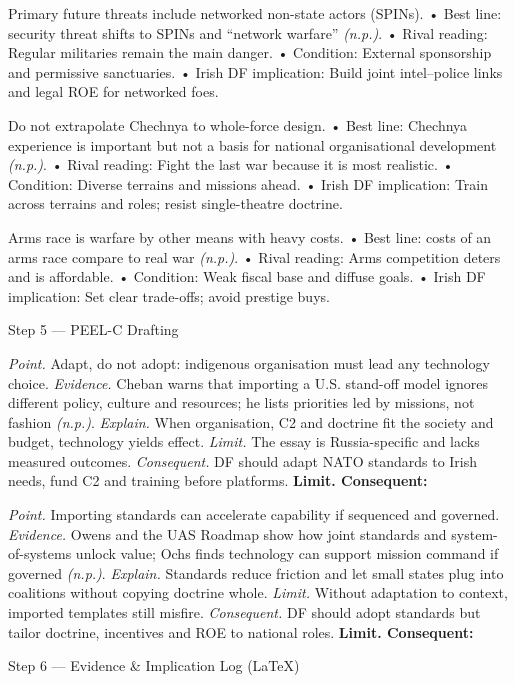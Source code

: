 Primary future threats include networked non-state actors (SPINs).
• Best line: security threat shifts to SPINs and “network warfare” \emph{(n.p.)}.
• Rival reading: Regular militaries remain the main danger.
• Condition: External sponsorship and permissive sanctuaries.
• Irish DF implication: Build joint intel–police links and legal ROE for networked foes.

Do not extrapolate Chechnya to whole-force design.
• Best line: Chechnya experience is important but not a basis for national organisational development \emph{(n.p.)}.
• Rival reading: Fight the last war because it is most realistic.
• Condition: Diverse terrains and missions ahead.
• Irish DF implication: Train across terrains and roles; resist single-theatre doctrine.

Arms race is warfare by other means with heavy costs.
• Best line: costs of an arms race compare to real war \emph{(n.p.)}.
• Rival reading: Arms competition deters and is affordable.
• Condition: Weak fiscal base and diffuse goals.
• Irish DF implication: Set clear trade-offs; avoid prestige buys.

Step 5 — PEEL-C Drafting

\textit{Point.} Adapt, do not adopt: indigenous organisation must lead any technology choice.
\textit{Evidence.} Cheban warns that importing a U.S. stand-off model ignores different policy, culture and resources; he lists priorities led by missions, not fashion \emph{(n.p.)}.
\textit{Explain.} When organisation, C2 and doctrine fit the society and budget, technology yields effect.
\textit{Limit.} The essay is Russia-specific and lacks measured outcomes.
\textit{Consequent.} DF should adapt NATO standards to Irish needs, fund C2 and training before platforms. \textbf{Limit. Consequent:}

\textit{Point.} Importing standards can accelerate capability if sequenced and governed.
\textit{Evidence.} Owens and the UAS Roadmap show how joint standards and system-of-systems unlock value; Ochs finds technology can support mission command if governed \emph{(n.p.)}.
\textit{Explain.} Standards reduce friction and let small states plug into coalitions without copying doctrine whole.
\textit{Limit.} Without adaptation to context, imported templates still misfire.
\textit{Consequent.} DF should adopt standards but tailor doctrine, incentives and ROE to national roles. \textbf{Limit. Consequent:}

Step 6 — Evidence \& Implication Log (LaTeX)

